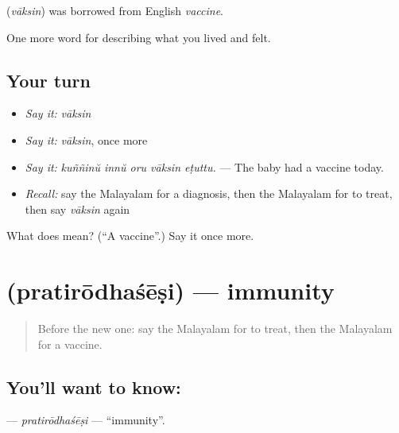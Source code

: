 \begin{cousinweb}
\textbf{} (\emph{vāksin}) was borrowed from English \emph{vaccine}.
\end{cousinweb}

\begin{grammarlens}[title={What you've built}]
One more word for describing what you lived and felt.
\end{grammarlens}

\subsection*{Your turn}
\begin{itemize}
\raggedright
  \item \emph{Say it:} \emph{vāksin}
  \item \emph{Say it:} \emph{vāksin}, once more
  \item \emph{Say it:} \emph{kuññinŭ innŭ oru vāksin eṭuttu.} — The baby had a vaccine today.
  \item \emph{Recall:} say the Malayalam for a diagnosis, then the Malayalam for to treat, then say \emph{vāksin} again
\end{itemize}

\begin{tcolorbox}[breakable,colback=teal!4,colframe=teal!35!black,title={Before you move on}]
What does  mean? (\textquotedblleft{}A vaccine\textquotedblright{}.) Say it once more.
\end{tcolorbox}
\section[\texorpdfstring{\ml{പ്രതിരോധശേഷി} (pratirōdhaśēṣi)}{പ്രതിരോധശേഷി (pratirōdhaśēṣi)}]{ (pratirōdhaśēṣi) — immunity}

\label{lesson:ML-C533-pratirodhasesi}



\begin{quote}
Before the new one: say the Malayalam for to treat, then the Malayalam for a vaccine.
\end{quote}

\subsection*{You'll want to know: }
\textbf{} — \emph{pratirōdhaśēṣi} — \textquotedblleft{}immunity\textquotedblright{}.

